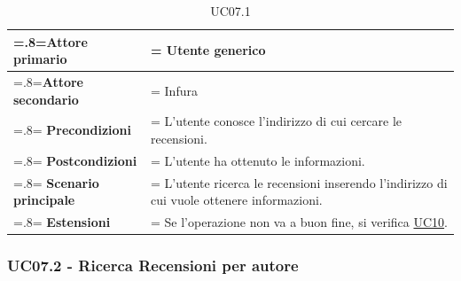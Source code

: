             \begin{table}[H]
                \centering
                \renewcommand{\arraystretch}{1.8}
                \renewcommand\tabularxcolumn[1]{m{#1}}
                \begin{tabularx}{0.9\textwidth} {
                    >{\hsize=.8\hsize\linewidth=\hsize}X
                    >{\hsize=1.2\hsize\linewidth=\hsize}X}
                    \hline
                    \textbf{Attore primario} & Utente generico \\
                    \hline
                    \textbf{Attore secondario} & Infura \\
                    \hline
                    \textbf{Precondizioni} & L'utente conosce l'indirizzo di cui cercare le recensioni. \\
                    \hline
                    \textbf{Postcondizioni} & L'utente ha ottenuto le informazioni. \\
                    \hline
                    \textbf{Scenario principale} & L'utente ricerca le recensioni inserendo l'indirizzo di cui vuole ottenere informazioni.\\
                    \hline
                    \textbf{Estensioni} & Se l'operazione non va a buon fine, si verifica \hyperref[UC10]{UC10}. \\
                    \hline
                \end{tabularx}
                \caption{UC07.1}
            \end{table}

        \subsubsection{UC07.2 - Ricerca Recensioni per autore}
        \label{UC07.2}

